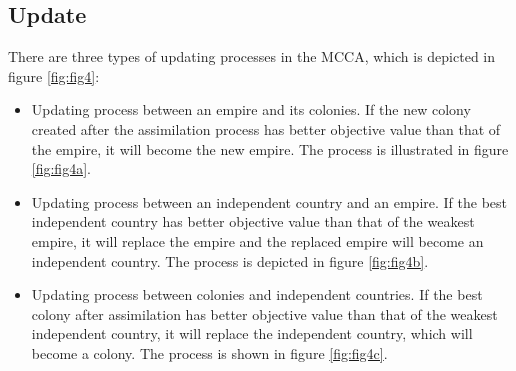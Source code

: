 \subsection{Update}
There are three types of updating processes in the MCCA, which is depicted in figure \ref{fig:fig4}:
\begin{itemize}
	\item Updating process between an empire and its colonies. If the new colony created after the assimilation process has better objective value than that of the empire, it will become the new empire. The process is illustrated in figure \ref{fig:fig4a}.
	\item Updating process between an independent country and an empire. If the best independent country has better objective value than that of the weakest empire, it will replace the empire and the replaced empire will become an independent country.  The process is depicted in figure \ref{fig:fig4b}.
	\item Updating process between colonies and independent countries. If the best colony after assimilation has better objective value than that of the weakest independent country, it will replace the independent country, which will become a colony. The process is shown in figure \ref{fig:fig4c}.
\end{itemize}

